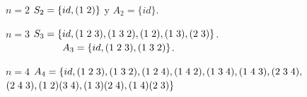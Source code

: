 \documentclass[11pt,a4paper]{article}
\begin{document}
\begin{enumerate*}
\item[$n = 2$] $S_{2} = \{id, (1 \hspace{0.1cm} 2)\}$ y $A_{2} = \{id\}$.

\item[$n = 3$] $S_{3} = \{id, (1 \hspace{0.1cm} 2 \hspace{0.1cm} 3), (1 \hspace{0.1cm} 3 \hspace{0.1cm} 2), (1 \hspace{0.1cm} 2), (1 \hspace{0.1cm} 3), (2 \hspace{0.1cm} 3)\}$.\\
$\hspace{2cm} A_{3} = \{id, (1 \hspace{0.1cm} 2 \hspace{0.1cm} 3), (1 \hspace{0.1cm} 3 \hspace{0.1cm} 2)\}$.

\item[$n = 4$] $A_{4} = \{id, (1 \hspace{0.1cm} 2 \hspace{0.1cm} 3), (1 \hspace{0.1cm} 3 \hspace{0.1cm} 2), (1 \hspace{0.1cm} 2 \hspace{0.1cm} 4), (1 \hspace{0.1cm} 4 \hspace{0.1cm} 2), (1 \hspace{0.1cm} 3 \hspace{0.1cm} 4), (1 \hspace{0.1cm} 4 \hspace{0.1cm} 3), (2 \hspace{0.1cm} 3 \hspace{0.1cm} 4),$ \\ $ (2 \hspace{0.1cm} 4 \hspace{0.1cm} 3), (1 \hspace{0.1cm} 2)(3 \hspace{0.1cm} 4), (1 \hspace{0.1cm} 3)(2 \hspace{0.1cm} 4), (1 \hspace{0.1cm} 4)(2 \hspace{0.1cm} 3) \}$
\end{enumerate*}
\end{document}
